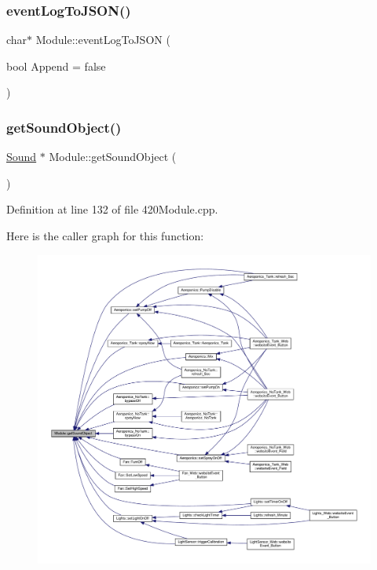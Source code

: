 \subsubsection{\texorpdfstring{event\+Log\+To\+J\+S\+O\+N()}{eventLogToJSON()}\hspace{0.1cm}{\footnotesize\ttfamily [2/2]}}
{\footnotesize\ttfamily char$\ast$ Module\+::event\+Log\+To\+J\+S\+ON (\begin{DoxyParamCaption}\item[{bool}]{Append = {\ttfamily false} }\end{DoxyParamCaption})\hspace{0.3cm}{\ttfamily [protected]}}

\mbox{\label{class_module_a1c18e93583f527d470be447a9fcd1a0b}} 
\subsubsection{\texorpdfstring{get\+Sound\+Object()}{getSoundObject()}\hspace{0.1cm}{\footnotesize\ttfamily [1/2]}}
{\footnotesize\ttfamily \hyperlink{class_sound}{Sound} $\ast$ Module\+::get\+Sound\+Object (\begin{DoxyParamCaption}{ }\end{DoxyParamCaption})}



Definition at line 132 of file 420\+Module.\+cpp.

Here is the caller graph for this function\+:
\nopagebreak
\begin{figure}[H]
\begin{center}
\leavevmode
\includegraphics[width=350pt]{class_module_a1c18e93583f527d470be447a9fcd1a0b_icgraph}
\end{center}
\end{figure}
\mbox{\label{class_module_a173624381666c28f9d33e809f067711c}} 
